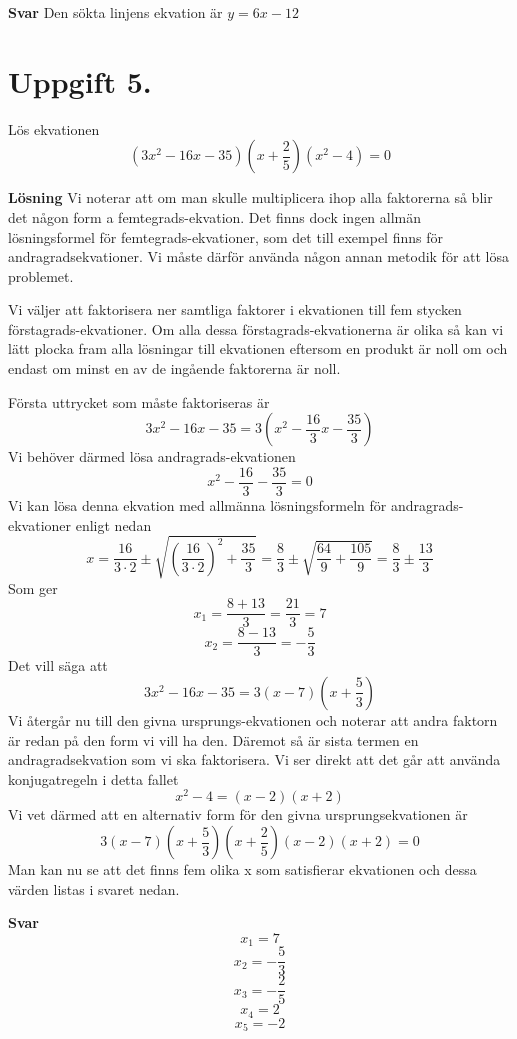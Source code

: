 \documentclass[fleqn]{article}
\begin{document}
\textbf{Svar}
Den sökta linjens ekvation är $y = 6x - 12$
 
\newpage
\section*{Uppgift 5.}

Lös ekvationen
\[
(3x^2 - 16x - 35)(x + \dfrac{2}{5})(x^2-4)=0
\]

\textbf{Lösning}
Vi noterar att om man skulle multiplicera ihop alla faktorerna så blir det någon form a femtegrads-ekvation. Det finns dock ingen allmän lösningsformel för femtegrads-ekvationer, som det till exempel finns för andragradsekvationer. Vi måste därför använda någon annan metodik för att lösa problemet.

Vi väljer att faktorisera ner samtliga faktorer i ekvationen till fem stycken förstagrads-ekvationer. Om alla dessa förstagrads-ekvationerna är olika så kan vi lätt plocka fram alla lösningar till ekvationen eftersom en produkt är noll om och endast om minst en av de ingående faktorerna är noll.

Första uttrycket som måste faktoriseras är 
\[
3x^2 - 16x - 35 = 3(x^2 - \dfrac{16}{3}x - \dfrac{35}{3})
\]
Vi behöver därmed lösa andragrads-ekvationen
\[
x^2 - \dfrac{16}{3} - \dfrac{35}{3} = 0 
\]
Vi kan lösa denna ekvation med allmänna lösningsformeln för andragrads-ekvationer enligt nedan
\[
x = \dfrac{16}{3 \cdot 2} \pm \sqrt{\left(\dfrac{16}{3 \cdot 2}\right) ^2+\dfrac{35}{3}} 
= \dfrac{8}{3} \pm \sqrt{\dfrac{64}{9}+\dfrac{105}{9}}
= \dfrac{8}{3} \pm \dfrac{13}{3}
\]
Som ger
\[
x_1 = \dfrac{8+13}{3} = \dfrac{21}{3} = 7
\]
\[
x_2 = \dfrac{8-13}{3} = -\dfrac{5}{3}
\]
Det vill säga att
\[
3x^2 - 16x - 35 = 3(x - 7)(x + \dfrac{5}{3})
\]
Vi återgår nu till den givna ursprungs-ekvationen och noterar att andra faktorn är redan på den form vi vill ha den. Däremot så är sista termen en andragradsekvation som vi ska faktorisera. Vi ser direkt att det går att använda konjugatregeln i detta fallet
\[
x^2 - 4=(x-2)(x+2)
\]
Vi vet därmed att en alternativ form för den givna ursprungsekvationen är
\[
3(x-7)(x + \dfrac{5}{3})(x + \dfrac{2}{5})(x - 2)(x + 2) = 0
\]
Man kan nu se att det finns fem olika x som satisfierar ekvationen och dessa värden listas i svaret nedan.

\textbf{Svar}
\[
x_1 = 7 
\]
\[
x_2 = -\dfrac{5}{3} 
\]
\[
x_3 = -\dfrac{2}{5} 
\]
\[
x_4 = 2
\]
\[
x_5 = -2
\]
\end{document}
